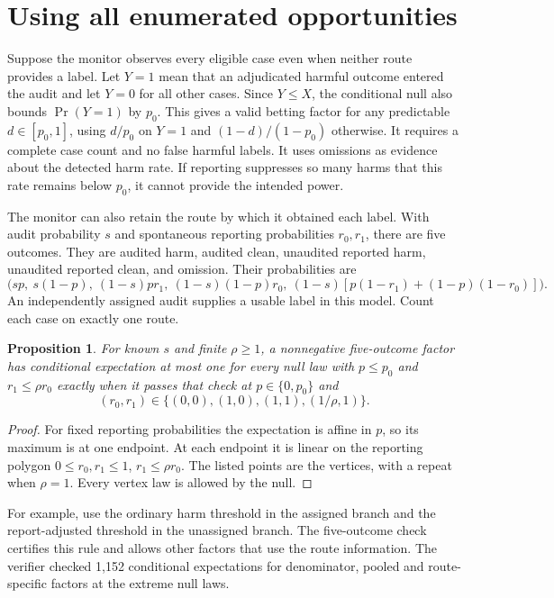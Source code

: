 \documentclass[11pt]{article}
\newtheorem{proposition}{Proposition}
\begin{document}
\section{Using all enumerated opportunities}
Suppose the monitor observes every eligible case even when neither
route provides a label. Let $Y=1$ mean that an adjudicated harmful
outcome entered the audit and let $Y=0$ for all other cases. Since
$Y\le X$, the conditional null also bounds $\Pr(Y=1)$ by $p_0$.
This gives a valid betting factor for any predictable $d\in[p_0,1]$,
using $d/p_0$ on $Y=1$ and $(1-d)/(1-p_0)$ otherwise.
It requires a complete case count and no false harmful labels.
It uses omissions as evidence about the detected harm rate.
If reporting suppresses so many harms that this rate remains
below $p_0$, it cannot provide the intended power.

The monitor can also retain the route by which it obtained each
label. With audit probability $s$ and spontaneous reporting
probabilities $r_0,r_1$, there are five outcomes. They are audited
harm, audited clean, unaudited reported harm, unaudited reported
clean, and omission. Their probabilities are
\[
 \bigl(sp,\ s(1-p),\ (1-s)pr_1,\ (1-s)(1-p)r_0,\
 (1-s)[p(1-r_1)+(1-p)(1-r_0)]\bigr).
\]
An independently assigned audit supplies a usable label in this
model. Count each case on exactly one route.

\begin{proposition}
For known $s$ and finite $\rho\ge1$, a nonnegative five-outcome
factor has conditional expectation at most one for every null law
with $p\le p_0$ and $r_1\le\rho r_0$ exactly when it passes that
check at $p\in\{0,p_0\}$ and
\[
 (r_0,r_1)\in\{(0,0),(1,0),(1,1),(1/\rho,1)\}.
\]
\end{proposition}
\begin{proof}
For fixed reporting probabilities the expectation is affine in
$p$, so its maximum is at one endpoint. At each endpoint it is
linear on the reporting polygon $0\le r_0,r_1\le1$,
$r_1\le\rho r_0$. The listed points are the vertices, with a
repeat when $\rho=1$. Every vertex law is allowed by the null.
\end{proof}

For example, use the ordinary harm threshold in the assigned
branch and the report-adjusted threshold in the unassigned branch.
The five-outcome check certifies this rule and allows other factors
that use the route information. The verifier checked 1,152
conditional expectations for denominator, pooled and route-specific
factors at the extreme null laws.
\end{document}
